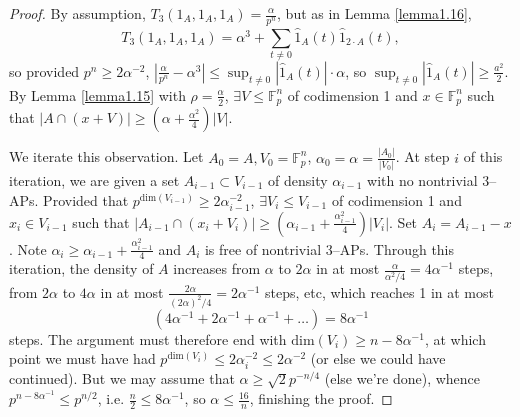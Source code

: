 \documentclass{article}
\theoremstyle{definition}
\begin{document}
\begin{proof}
    By assumption, $T_3(1_A,1_A,1_A) = \frac{\alpha}{p^n}$, but as in Lemma \ref{lemma1.16}, \[
    T_3(1_A,1_A,1_A) = \alpha^3 + \sum_{t\neq 0}^{} \hat{1}_A(t) \hat{1}_{2\cdot A}(t),
    \]
    so provided $p^n \ge 2\alpha^{-2}$, $\left|\frac{\alpha}{p^n}-\alpha^3 \right| \le  \sup_{t\neq 0} |\hat{1}_A(t)| \cdot \alpha$, so $\sup_{t\neq 0}|\hat{1}_A(t)| \ge \frac{a^2}{2}$.
    By Lemma \ref{lemma1.15} with $\rho = \frac{\alpha}{2}$, $\exists V \le \mathbb{F}_p^n$ of codimension 1 and $x \in \mathbb{F}_p^n$ such that $|A \cap (x+V)| \ge \left(\alpha +\frac{\alpha^2}{4}\right)|V|$.
    \vspace{1mm}
     
    We iterate this observation. Let $A_0 = A, V_0 = \mathbb{F}_p^n$, $\alpha_0 = \alpha = \frac{|A_0|}{|V_0|}$. At step $i$ of this iteration, we are given a set $A_{i-1} \subset V_{i-1}$ of density $\alpha_{i-1}$ with no nontrivial 3--APs. Provided that $p^{\text{dim}(V_{i-1})}\ge 2\alpha_{i-1}^{-2}$, $\exists V_i \le V_{i-1}$ of codimension 1 and $x_i \in V_{i-1}$ such that $|A_{i-1} \cap (x_i + V_i)|\ge \left(\alpha_{i-1} + \frac{\alpha_{i-1}^2}{4}\right)|V_{i}|$. Set $A_i = A_{i-1} - x$. Note $\alpha_i \ge \alpha_{i-1}+\frac{\alpha_{i-1}^2}{4}$ and $A_i$ is free of nontrivial 3--APs. Through this iteration, the density of $A$ increases from $\alpha$ to $2\alpha$ in at most $\frac{\alpha}{\alpha^2/4} = 4\alpha^{-1}$ steps, from $2\alpha$ to $4\alpha$ in at most $\frac{2\alpha}{(2\alpha)^2/4} = 2\alpha^{-1}$ steps, etc, which reaches 1 in at most 
    \[
        (4\alpha^{-1} + 2\alpha^{-1} + \alpha^{-1} + \ldots) = 8\alpha^{-1}
    \]
    steps. The argument must therefore end with $\text{dim}(V_i)\ge n - 8\alpha^{-1}$, at which point we must have had $p^{\text{dim}(V_i)}\le 2\alpha_i^{-2}\le 2\alpha^{-2}$ (or else we could have continued). But we may assume that $\alpha \ge \sqrt{2}p^{-n/4}$ (else we're done), whence $p^{n - 8 \alpha ^{-1}} \le p^{n/2}$, i.e. $\frac{n}{2} \le 8\alpha ^{-1}$, so $\alpha \le \frac{16}{n}$, finishing the proof. 
\end{proof}
\end{document}
